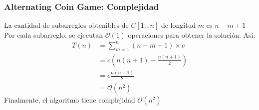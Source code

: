 \documentclass[10pt]{beamer}
\begin{document}
    \begin{frame}
        \frametitle{Alternating Coin Game: Complejidad}
        La cantidad de subarreglos obtenibles de $C[1...n]$ de longitud $m$ es $n-m+1$
        Por cada subarreglo, se ejecutan $\mathcal{O}(1)$ operaciones para obtener la solución.
        Así:
        \begin{align*}
            T(n)&=\sum_{m = 1}^{n} (n-m+1) \times c \\
            &= c \left( n(n+1) - \frac{n(n+1)}{2} \right) \\
            &= c\frac{n(n+1)}{2}\\
            &= \mathcal{O}(n^2)
        \end{align*}
        Finalmente, el algoritmo tiene complejidad $\mathcal{O}(n^2)$
    \end{frame}
\end{document}
